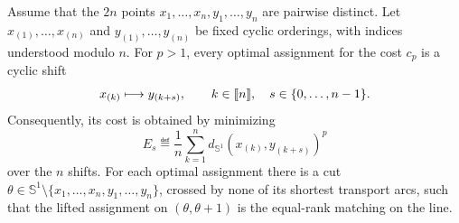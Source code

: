 \begin{proposition}\label{prop-circle-ot-cut}
	Assume that the $2n$ points $x_1,\ldots,x_n,y_1,\ldots,y_n$ are pairwise distinct. Let $x_{(1)},\ldots,x_{(n)}$ and $y_{(1)},\ldots,y_{(n)}$ be fixed cyclic orderings, with indices understood modulo $n$. For $p>1$, every optimal assignment for the cost $c_p$ is a cyclic shift
	\[
		x_{(k)}\longmapsto y_{(k+s)},
		\qquad k\in\llbracket n\rrbracket,\quad s\in\{0,\ldots,n-1\}.
	\]
	Consequently, its cost is obtained by minimizing
	\[
		E_s
		\eqdef
		\frac1n\sum_{k=1}^n
		d_{\mathbb S^1}\!\left(x_{(k)},y_{(k+s)}\right)^p
	\]
	over the $n$ shifts. For each optimal assignment there is a cut $\theta\in\mathbb S^1\setminus\{x_1,\ldots,x_n,y_1,\ldots,y_n\}$, crossed by none of its shortest transport arcs, such that the lifted assignment on $(\theta,\theta+1)$ is the equal-rank matching on the line.
\end{proposition}

